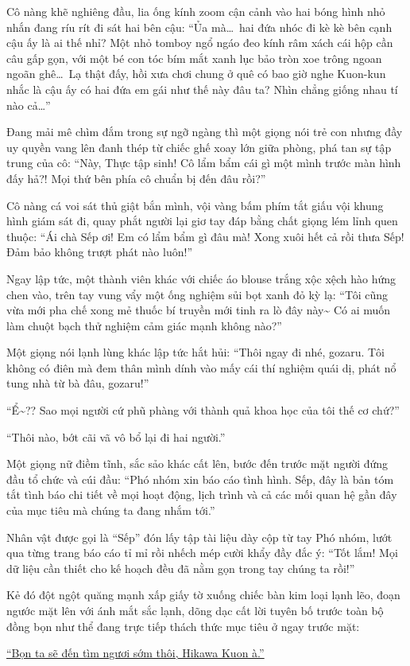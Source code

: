 \documentclass[../main.tex]{subfiles}
\begin{document}
Cô nàng khẽ nghiêng đầu, lia ống kính zoom cận cảnh vào hai bóng hình nhỏ nhắn đang ríu rít đi sát hai bên cậu: ``Ủa mà\dots\ hai đứa nhóc đi kè kè bên cạnh cậu ấy là ai thế nhỉ? Một nhỏ tomboy ngổ ngáo đeo kính râm xách cái hộp cần câu gấp gọn, với một bé con tóc bím mắt xanh lục bảo tròn xoe trông ngoan ngoãn ghê\dots\ Lạ thật đấy, hồi xưa chơi chung ở quê có bao giờ nghe Kuon-kun nhắc là cậu ấy có hai đứa em gái như thế này đâu ta? Nhìn chẳng giống nhau tí nào cả\dots''

Đang mải mê chìm đắm trong sự ngỡ ngàng thì một giọng nói trẻ con nhưng đầy uy quyền vang lên đanh thép từ chiếc ghế xoay lớn giữa phòng, phá tan sự tập trung của cô: ``Này, Thực tập sinh! Cô lẩm bẩm cái gì một mình trước màn hình đấy hả?! Mọi thứ bên phía cô chuẩn bị đến đâu rồi?''

Cô nàng cá voi sát thủ giật bắn mình, vội vàng bấm phím tắt giấu vội khung hình giám sát đi, quay phắt người lại giơ tay đáp bằng chất giọng lém lỉnh quen thuộc: ``Ái chà Sếp ơi! Em có lẩm bẩm gì đâu mà! Xong xuôi hết cả rồi thưa Sếp! Đảm bảo không trượt phát nào luôn!''

Ngay lập tức, một thành viên khác với chiếc áo blouse trắng xộc xệch hào hứng chen vào, trên tay vung vẩy một ống nghiệm sủi bọt xanh đỏ kỳ lạ: ``Tôi cũng vừa mới pha chế xong mẻ thuốc bí truyền mới tinh ra lò đây này\~{} Có ai muốn làm chuột bạch thử nghiệm cảm giác mạnh không nào?''

Một giọng nói lạnh lùng khác lập tức hắt hủi: ``Thôi ngay đi nhé, gozaru. Tôi không có điên mà đem thân mình dính vào mấy cái thí nghiệm quái dị, phát nổ tung nhà từ bà đâu, gozaru!''

``Ể\~{}?? Sao mọi người cứ phũ phàng với thành quả khoa học của tôi thế cơ chứ?''

``Thôi nào, bớt cãi vã vô bổ lại đi hai người.''

Một giọng nữ điềm tĩnh, sắc sảo khác cất lên, bước đến trước mặt người đứng đầu tổ chức và cúi đầu: ``Phó nhóm xin báo cáo tình hình. Sếp, đây là bản tóm tắt tình báo chi tiết về mọi hoạt động, lịch trình và cả các mối quan hệ gần đây của mục tiêu mà chúng ta đang nhắm tới.''

Nhân vật được gọi là ``Sếp'' đón lấy tập tài liệu dày cộp từ tay Phó nhóm, lướt qua từng trang báo cáo tỉ mỉ rồi nhếch mép cười khẩy đầy đắc ý: ``Tốt lắm! Mọi dữ liệu cần thiết cho kế hoạch đều đã nằm gọn trong tay chúng ta rồi!''

Kẻ đó đột ngột quăng mạnh xấp giấy tờ xuống chiếc bàn kim loại lạnh lẽo, đoạn ngước mặt lên với ánh mắt sắc lạnh, dõng dạc cất lời tuyên bố trước toàn bộ đồng bọn như thể đang trực tiếp thách thức mục tiêu ở ngay trước mặt:

\begin{center}
    \uline{``Bọn ta sẽ đến tìm ngươi sớm thôi, Hikawa Kuon à.''}
\end{center}
\end{document}
